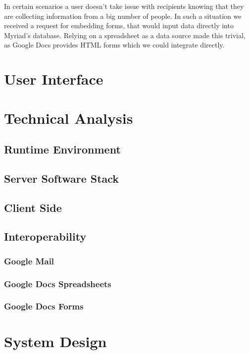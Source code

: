 In certain scenarios a user doesn't take issue with recipients knowing that they are collecting information from a big number of people. In such a situation we received a request for embedding forms, that would input data directly into Myriad’s database. Relying on a spreadsheet as a data source made this trivial, as Google Docs provides HTML forms which we could integrate directly.


\section{User Interface}


\section{Technical Analysis}

\subsection{Runtime Environment}

\subsection{Server Software Stack}

\subsection{Client Side}

\subsection{Interoperability}



\subsubsection{Google Mail}


\subsubsection{Google Docs Spreadsheets}


\subsubsection{Google Docs Forms}



\section{System Design}


